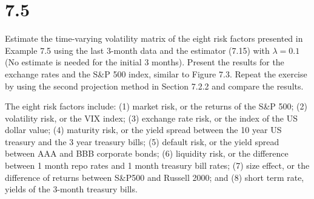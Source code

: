 \documentclass[11pt,]{article}
\renewenvironment{quote}{\begin{shaded*}}{\end{shaded*}}
\begin{document}
\section{7.5}\label{section-3}

Estimate the time-varying volatility matrix of the eight risk factors
presented in Example 7.5 using the last 3-month data and the estimator
(7.15) with \(\lambda =0.1\) (No estimate is needed for the initial 3
months). Present the results for the exchange rates and the S\&P 500
index, similar to Figure 7.3. Repeat the exercise by using the second
projection method in Section 7.2.2 and compare the results.

\begin{quote}
The eight risk factors include: (1) market risk, or the returns of the
S\&P 500; (2) volatility risk, or the VIX index; (3) exchange rate risk,
or the index of the US dollar value; (4) maturity risk, or the yield
spread between the 10 year US treasury and the 3 year treasury bills;
(5) default risk, or the yield spread between AAA and BBB corporate
bonds; (6) liquidity risk, or the difference between 1 month repo rates
and 1 month treasury bill rates; (7) size effect, or the difference of
returns between S\&P500 and Russell 2000; and (8) short term rate,
yields of the 3-month treasury bills.
\end{quote}
\end{document}
